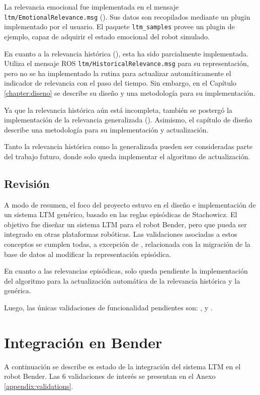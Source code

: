 La relevancia emocional fue implementada en el mensaje \texttt{ltm/EmotionalRelevance.msg} (). Sus datos son recopilados mediante un plugin implementado por el usuario. El paquete \texttt{ltm\_samples} provee un plugin de ejemplo, capaz de adquirir el estado emocional del robot simulado.

En cuanto a la relevancia histórica (), esta ha sido parcialmente implementada. Utiliza el mensaje ROS \texttt{ltm/HistoricalRelevance.msg} para su representación, pero no se ha implementado la rutina para actualizar automáticamente el indicador de relevancia con el paso del tiempo. Sin embargo, en el Capítulo \ref{chapter:diseno} se describe su diseño y una metodología para su implementación.

Ya que la relevancia histórica aún está incompleta, también se postergó la implementación de la relevancia generalizada (). Asimismo, el capítulo de diseño describe una metodología para su implementación y actualización.

Tanto la relevancia histórica como la generalizada pueden ser consideradas parte del trabajo futuro, donde solo queda implementar el algoritmo de actualización.


\subsection{Revisión}

A modo de resumen, el foco del proyecto estuvo en el diseño e implementación de un sistema LTM genérico, basado en las reglas episódicas de Stachowicz. El objetivo fue diseñar un sistema LTM para el robot Bender, pero que pueda ser integrado en otras plataformas robóticas. Las validaciones asociadas a estos conceptos se cumplen todas, a excepción de , relacionada con la migración de la base de datos al modificar la representación episódica.

En cuanto a las relevancias episódicas, solo queda pendiente la implementación del algoritmo para la actualización automática de la relevancia histórica y la genérica.

Luego, las únicas validaciones de funcionalidad pendientes son: ,  y .


\section{Integración en Bender}

A continuación se describe es estado de la integración del sistema LTM en el robot Bender. Las 6 validaciones de interés se presentan en el Anexo \ref{appendix:validations}.

